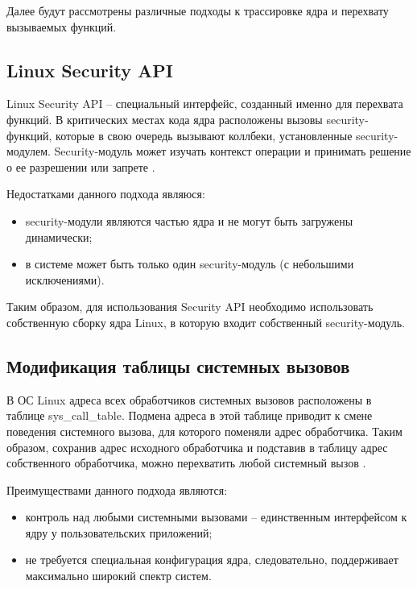 Далее будут рассмотрены различные подходы к трассировке ядра и перехвату вызываемых функций.

\subsection{Linux Security API}

Linux Security API -- специальный интерфейс, созданный именно для перехвата функций. В критических местах кода ядра расположены вызовы security-функций, которые в свою очередь вызывают коллбеки, установленные security-модулем. Security-модуль может изучать контекст операции и принимать решение о ее разрешении или запрете \cite{tras_ftrace}.

Недостатками данного подхода являюся:

\begin{itemize}
	\item security-модули являются частью ядра и не могут быть загружены динамически;
	\item в системе может быть только один security-модуль (с небольшими исключениями).
\end{itemize}

Таким образом, для использования Security API необходимо использовать собственную сборку ядра Linux, в которую входит собственный security-модуль.

\subsection{Модификация таблицы системных вызовов}

В ОС Linux адреса всех обработчиков системных вызовов расположены в таблице sys\_call\_table. Подмена адреса в этой таблице приводит к смене поведения системного вызова, для которого поменяли адрес обработчика. Таким образом, сохранив адрес исходного обработчика и подставив в таблицу адрес собственного обработчика, можно перехватить любой системный вызов \cite{tras_ftrace}.

Преимуществами данного подхода являются:

\begin{itemize}
	\item контроль над любыми системными вызовами -- единственным интерфейсом к ядру у пользовательских приложений;
	\item не требуется специальная конфигурация ядра, следовательно, поддерживает максимально широкий спектр систем.
\end{itemize}

